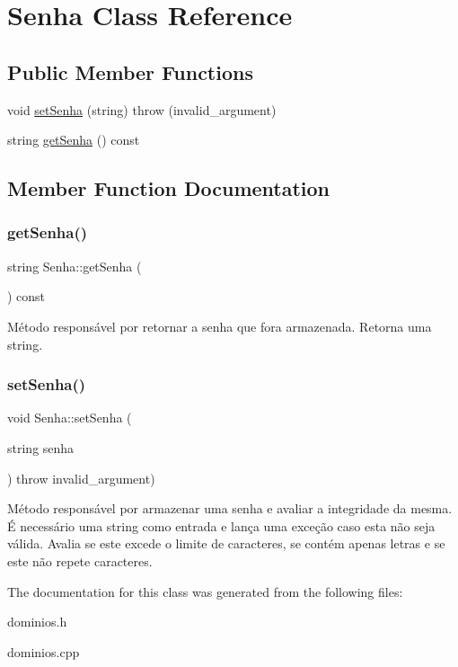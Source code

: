 \hypertarget{classSenha}{}\section{Senha Class Reference}
\label{classSenha}
\subsection*{Public Member Functions}
\begin{DoxyCompactItemize}
\item 
void \hyperlink{classSenha_a735e4bf5f65cc8d28daa7dbf202fd999}{set\+Senha} (string)  throw (invalid\+\_\+argument)
\item 
string \hyperlink{classSenha_a1cc904431d0a8287d0b22dee3e9d34ae}{get\+Senha} () const
\end{DoxyCompactItemize}


\subsection{Member Function Documentation}
\mbox{\label{classSenha_a1cc904431d0a8287d0b22dee3e9d34ae}} 
\subsubsection{\texorpdfstring{get\+Senha()}{getSenha()}}
{\footnotesize\ttfamily string Senha\+::get\+Senha (\begin{DoxyParamCaption}{ }\end{DoxyParamCaption}) const\hspace{0.3cm}{\ttfamily [inline]}}

Método responsável por retornar a senha que fora armazenada. Retorna uma string. \mbox{\label{classSenha_a735e4bf5f65cc8d28daa7dbf202fd999}} 
\subsubsection{\texorpdfstring{set\+Senha()}{setSenha()}}
{\footnotesize\ttfamily void Senha\+::set\+Senha (\begin{DoxyParamCaption}\item[{string}]{senha }\end{DoxyParamCaption}) throw  invalid\+\_\+argument) }

Método responsável por armazenar uma senha e avaliar a integridade da mesma. É necessário uma string como entrada e lança uma exceção caso esta não seja válida. Avalia se este excede o limite de caracteres, se contém apenas letras e se este não repete caracteres. 

The documentation for this class was generated from the following files\+:\begin{DoxyCompactItemize}
\item 
dominios.\+h\item 
dominios.\+cpp\end{DoxyCompactItemize}
